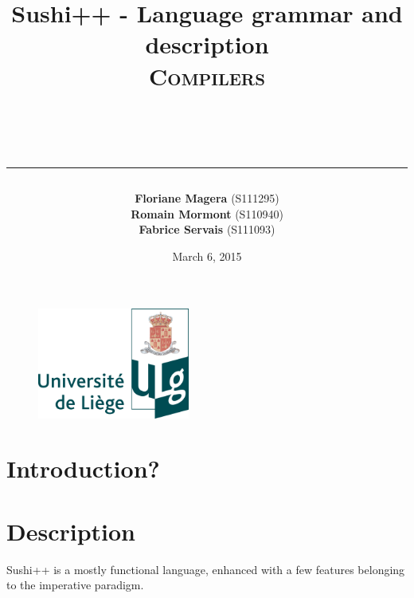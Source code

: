 \documentclass[a4paper,titlepage]{article}
\begin{document}
\begin{titlepage}

\begin{figure}
\centering
\includegraphics[width=5cm]{logo-ulg.png}
\end{figure}



\title{
\vspace{0.2cm}
\LARGE{\textbf{Sushi++ - Language grammar and description}} \\ \textsc{Compilers}
\author{\textbf{Floriane Magera} \small{(S111295})\\\textbf{Romain Mormont} \small{(S110940})\\\textbf{Fabrice Servais} \small{(S111093})}\\
\date{March 6, 2015}
\rule{15cm}{1.5pt}
}

\end{titlepage}

\pagestyle{fancy}

\maketitle
  
\section{Introduction?}



\section{Description}

Sushi++ is a mostly functional language, enhanced with a few features belonging to the imperative paradigm.
\end{document}
